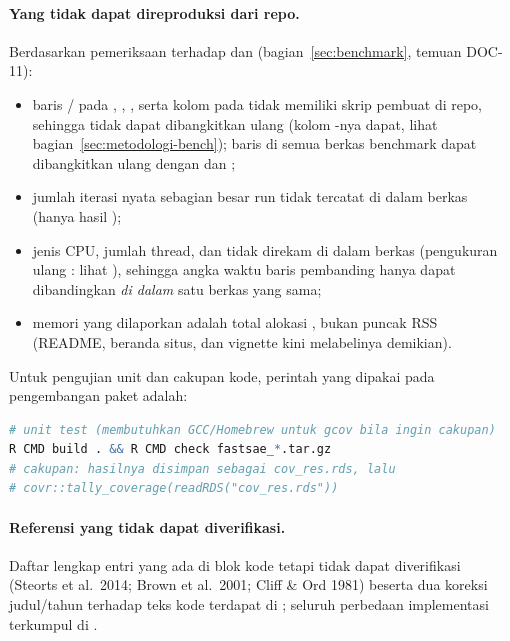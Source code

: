 \paragraph{Yang tidak dapat direproduksi dari repo.}
Berdasarkan pemeriksaan terhadap  dan
 (bagian~\ref{sec:benchmark}, temuan DOC-11):
\begin{itemize}
  \item baris / pada ,
        , , serta
        kolom  pada  tidak
        memiliki skrip pembuat di repo, sehingga tidak dapat dibangkitkan
        ulang (kolom -nya dapat, lihat
        bagian~\ref{sec:metodologi-bench}); baris 
        di semua berkas benchmark dapat dibangkitkan ulang dengan
         dan
        ;
  \item jumlah iterasi nyata sebagian besar run tidak tercatat di dalam
        berkas (hanya  hasil );
  \item jenis CPU, jumlah thread, dan  tidak direkam
        di dalam berkas (pengukuran ulang : lihat
        ), sehingga angka waktu baris
        pembanding hanya dapat dibandingkan \emph{di dalam} satu berkas yang
        sama;
  \item memori yang dilaporkan adalah total alokasi ,
        bukan puncak RSS (README, beranda situs, dan vignette kini
        melabelinya demikian).
\end{itemize}
Untuk pengujian unit dan cakupan kode, perintah yang dipakai pada
pengembangan paket adalah:
\begin{lstlisting}[language=R]
# unit test (membutuhkan GCC/Homebrew untuk gcov bila ingin cakupan)
R CMD build . && R CMD check fastsae_*.tar.gz
# cakupan: hasilnya disimpan sebagai cov_res.rds, lalu
# covr::tally_coverage(readRDS("cov_res.rds"))
\end{lstlisting}

\paragraph{Referensi yang tidak dapat diverifikasi.}
Daftar lengkap entri yang ada di blok  kode tetapi tidak
dapat diverifikasi (Steorts et al.\ 2014; Brown et al.\ 2001; Cliff \&
Ord 1981) beserta dua koreksi judul/tahun terhadap teks kode terdapat di
; seluruh perbedaan implementasi terkumpul di
.
